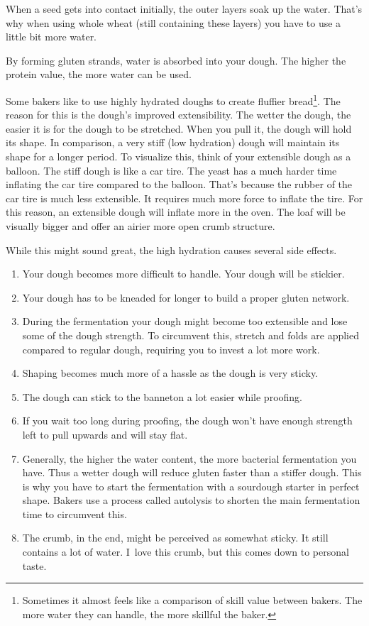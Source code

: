 When a seed gets into contact initially, the outer layers soak up the water.
That's why when using whole wheat (still containing these layers) you have to
use a little bit more water.

By forming gluten strands, water is absorbed into your dough. The higher the
protein value, the more water can be used.

Some bakers like to use highly hydrated doughs to create fluffier
bread\footnote{Sometimes it almost feels like a comparison of skill value
between bakers. The more water they can handle, the more skillful the baker.}.
The reason for this
is the dough's improved extensibility. The wetter the dough, the easier it is
for the dough to be stretched. When you pull it, the dough will hold its
shape. In comparison, a very stiff (low hydration) dough will maintain its
shape for a longer period. To visualize this, think of your extensible
dough as a balloon. The stiff dough is like a car tire.
The yeast has a much harder time inflating the car tire compared to the balloon.
That’s because the rubber of the car tire is much less extensible.
It requires much more force to inflate the tire. For this reason,
an extensible dough will inflate more in the oven. The loaf will
be visually bigger and offer an airier more open crumb structure.

While this might sound great, the high hydration causes several side effects.

\begin{enumerate}
  \item Your dough becomes more difficult to handle. Your dough will be stickier.
  \item Your dough has to be kneaded for longer to build a proper gluten
    network.
  \item During the fermentation your dough might become too extensible and lose
    some of the dough strength. To circumvent this, stretch and folds are applied
    compared to regular dough,
    requiring you to invest a lot more work.
  \item Shaping becomes much more of a hassle as the dough is very sticky.
  \item The dough can stick to the banneton a lot easier while proofing.
  \item If you wait too long during proofing, the dough won't have enough strength
    left to pull upwards and will stay flat.
  \item Generally, the higher the water content, the more bacterial fermentation you
    have. Thus a wetter dough will reduce gluten faster than a stiffer dough.
    This is why you have to start the fermentation with a sourdough starter in
    perfect shape. Bakers use a process called autolysis to shorten the main
    fermentation time to circumvent this.
  \item The crumb, in the end, might be perceived as somewhat sticky. It still
    contains a lot of water. I~love this crumb, but this comes down to personal
    taste.
\end{enumerate}

